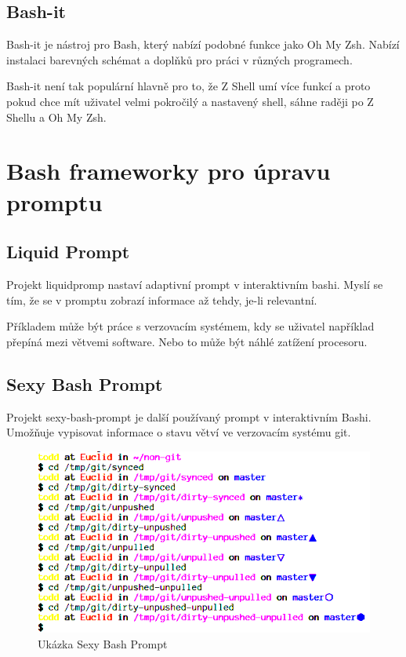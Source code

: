 \documentclass[thesis=M,czech]{FITthesis}[2012/06/26]
\begin{document}

%
%
%
\subsection{Bash-it}

Bash-it je nástroj pro Bash, který nabízí podobné funkce jako Oh My Zsh. Nabízí instalaci barevných schémat a doplňků pro práci v různých programech.

Bash-it není tak populární hlavně pro to, že Z Shell umí více funkcí a proto pokud chce mít uživatel velmi pokročilý a nastavený shell, sáhne raději po Z Shellu a Oh My Zsh.


%

%
%
%
\section{Bash frameworky pro úpravu promptu}

\subsection{Liquid Prompt}

Projekt liquidpromp nastaví adaptivní prompt v interaktivním bashi. Myslí se tím, že se v promptu zobrazí informace až tehdy, je-li relevantní.

Příkladem může být práce s verzovacím systémem, kdy se uživatel například přepíná mezi větvemi software. Nebo to může být náhlé zatížení procesoru.


\subsection{Sexy Bash Prompt}

Projekt sexy-bash-prompt je další používaný prompt v interaktivním Bashi. Umožňuje vypisovat informace o stavu větví ve verzovacím systému git.

\begin{figure}[htb]\centering
	\includegraphics[width=\textwidth]{./images/sexy_prompt_edited}
	\caption{Ukázka Sexy Bash Prompt}
	\label{fig:shell_history}
\end{figure}
\end{document}
